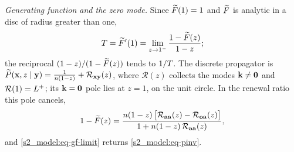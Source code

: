 \emph{Generating function and the zero mode.} Since $\widetilde{F}(1)=1$ and $\widetilde{F}$ is analytic in a disc of radius greater
than one,
\begin{equation}\label{s2_model:eq-gf-limit}
  T=\widetilde{F}'(1)=\lim_{z\to1^{-}}\frac{1-\widetilde{F}(z)}{1-z};
\end{equation}
the reciprocal $(1-z)/(1-\widetilde{F}(z))$ tends to $1/T$. The discrete propagator is
$\widetilde{P}(\mathbf{x},z\mid\mathbf{y})=\frac{1}{n(1-z)}+\mathcal R_{\mathbf{x}\mathbf{y}}(z)$, where $\mathcal R(z)$ collects the modes
$\mathbf{k}\neq\mathbf 0$ and $\mathcal R(1)=L^{+}$; its $\mathbf{k}=\mathbf 0$ pole lies at $z=1$, on the unit circle. In the renewal
ratio this pole cancels,
\[
  1-\widetilde{F}(z)=\frac{n(1-z)\,\bigl[\mathcal R_{\mathbf{a}\mathbf{a}}(z)-\mathcal R_{\mathbf{o}\mathbf{a}}(z)\bigr]}{1+n(1-z)\,\mathcal R_{\mathbf{a}\mathbf{a}}(z)},
\]
and \eqref{s2_model:eq-gf-limit} returns \eqref{s2_model:eq-pinv}.
